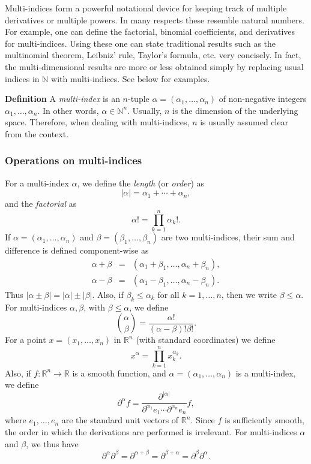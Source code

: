 \documentclass[12pt]{article}
\newcommand{\sN}[0]{\mathbb{N}}
\begin{document}
Multi-indices form a powerful notational device for keeping track
of multiple derivatives or multiple powers. In many respects 
these resemble natural numbers. 
For example, one can define the factorial, binomial coefficients,
and derivatives for multi-indices. 
Using these one can state traditional results such as the
multinomial theorem, 
Leibniz' rule, Taylor's formula, etc. 
very concisely. In fact, the multi-dimensional results are more or
 less obtained simply by  replacing usual indices in $\sN$ with multi-indices. 
See below for examples.

{\bf Definition}
A \emph{multi-index} is an $n$-tuple 
$\alpha=(\alpha_1,\ldots, \alpha_n)$ of non-negative integers $\alpha_1,\ldots, \alpha_n$. In other words,
$\alpha \in \sN^n$. Usually, $n$ is the dimension of the underlying space.
Therefore, when dealing with multi-indices, $n$ is usually 
assumed clear from the context.

\subsubsection*{Operations on multi-indices}
For a multi-index $\alpha$, we define the \emph{length} (or \emph{order}) as
$$ 
  |\alpha| = \alpha_1+\cdots + \alpha_n,
$$
and the \emph{factorial}  as
$$ 
  \alpha! = \prod_{k=1}^n \alpha_k!.
$$
If $\alpha=(\alpha_1,\ldots, \alpha_n)$ and 
$\beta=(\beta_1,\ldots, \beta_n)$ are two multi-indices, 
their sum and difference is defined  component-wise as
\begin{eqnarray*}
 \alpha+\beta &=&(\alpha_1+\beta_1, \ldots, \alpha_n+\beta_n),\\
 \alpha-\beta &=&(\alpha_1-\beta_1, \ldots, \alpha_n-\beta_n).
\end{eqnarray*}
Thus $|\alpha\pm \beta| = |\alpha|\pm |\beta|$.
Also, if $\beta_k\le \alpha_k$ for all $k=1,\ldots, n$, then we write 
$\beta\le \alpha$. For multi-indices $\alpha,\beta$, with  
$\beta\le \alpha$, we define
$$ 
  {\alpha\choose \beta} = \frac{\alpha!}{(\alpha-\beta)! \beta!}.
$$
For a point $x=(x_1,\ldots, x_n)$ in $\mathbb{R}^n$ (with 
standard coordinates) we define 
$$ 
  x^\alpha= \prod_{k=1}^n x_k^{\alpha_k}.
$$
Also, if $f\colon \mathbb{R}^n \to \mathbb{R}$ is a smooth function, and
$\alpha=(\alpha_1,\ldots, \alpha_n)$ is a multi-index, we define 
$$   
  \partial^\alpha f = \frac{\partial^{|\alpha|}}{\partial^{\alpha_1}e_1 \cdots \partial^{\alpha_n}e_n} f,
$$
where $e_1,\ldots, e_n$ are the standard unit vectors of $\mathbb{R}^n$. 
Since $f$ is sufficiently smooth, the order in which the derivations are 
performed is irrelevant. For multi-indices $\alpha$ and $\beta$, we thus
have 
$$ 
  \partial^\alpha \partial^\beta = \partial^{\alpha+\beta} = \partial^{\beta+\alpha} = \partial^\beta \partial^\alpha.
$$
\end{document}
